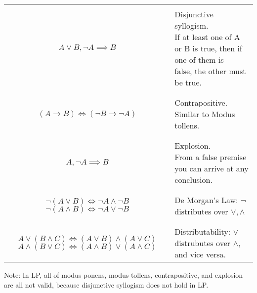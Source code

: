 \documentclass{article}
\begin{document}
\begin{table}[H]
\begin{tabular}{c l}
        &\\
        $A \vee B, \lnot A \implies B$ & \makecell[l]{
            Disjunctive syllogism.\\
            If at least one of A or B is true, then if one of them is \\false, the other must be true.
        }\\
        &\\
        \hline
        &\\
        $(A \rightarrow B) \iff (\lnot B \rightarrow \lnot A)$ & Contrapositive. Similar to Modus tollens.\\
        &\\
        \hline
        &\\
        $A, \lnot A \implies B$ & \makecell[l]{
            Explosion. \\
            From a false premise you can arrive at any conclusion.
        }\\
        &\\
        \hline
        &\\
        \makecell{
            $\lnot (A \vee B) \iff \lnot A \wedge \lnot B$\\
            $\lnot (A \wedge B) \iff \lnot A \vee \lnot B$
        } & De Morgan's Law: $\lnot$ distributes over $\vee, \wedge$\\
        &\\
        \hline
        &\\
        \makecell{
            $A \vee (B \wedge C) \iff (A\vee B) \wedge (A \vee C)$\\
            $A \wedge (B \vee C) \iff (A \wedge B)\vee (A \wedge C)$
        } & Distributability: $\vee$ distrubutes over $\wedge$, and vice versa.

    \end{tabular}
\end{table} 

\large Note: In LP, all of modus ponens, modus tollens, contrapositive, and explosion are all not valid, because 
disjunctive syllogism does not hold in LP. 
\end{document}
